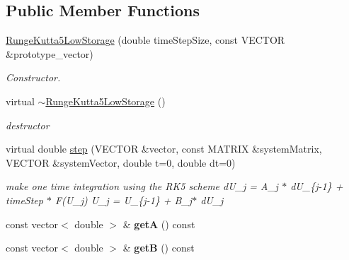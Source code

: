 \subsection*{Public Member Functions}
\begin{DoxyCompactItemize}
\item 
\hyperlink{classnatrium_1_1RungeKutta5LowStorage_a1f879ee900db9ac82ddd12820e7b703d}{RungeKutta5LowStorage} (double timeStepSize, const VECTOR \&prototype\_\-vector)
\begin{DoxyCompactList}\small\item\em Constructor. \item\end{DoxyCompactList}\item 
\hypertarget{classnatrium_1_1RungeKutta5LowStorage_a915493da30cf9308bd47e87d0c20cad8}{
virtual \hyperlink{classnatrium_1_1RungeKutta5LowStorage_a915493da30cf9308bd47e87d0c20cad8}{$\sim$RungeKutta5LowStorage} ()}
\label{classnatrium_1_1RungeKutta5LowStorage_a915493da30cf9308bd47e87d0c20cad8}

\begin{DoxyCompactList}\small\item\em destructor \item\end{DoxyCompactList}\item 
\hypertarget{classnatrium_1_1RungeKutta5LowStorage_a90a1bec53a8fd458a190d3e9f8c78478}{
virtual double \hyperlink{classnatrium_1_1RungeKutta5LowStorage_a90a1bec53a8fd458a190d3e9f8c78478}{step} (VECTOR \&vector, const MATRIX \&systemMatrix, VECTOR \&systemVector, double t=0, double dt=0)}
\label{classnatrium_1_1RungeKutta5LowStorage_a90a1bec53a8fd458a190d3e9f8c78478}

\begin{DoxyCompactList}\small\item\em make one time integration using the RK5 scheme dU\_\-j = A\_\-j $\ast$ dU\_\-\{j-\/1\} + timeStep $\ast$ F(U\_\-j) U\_\-j = U\_\-\{j-\/1\} + B\_\-j$\ast$ dU\_\-j \item\end{DoxyCompactList}\item 
\hypertarget{classnatrium_1_1RungeKutta5LowStorage_a452fad5bef3b7734c94ca5796ce0c589}{
const vector$<$ double $>$ \& {\bfseries getA} () const }
\label{classnatrium_1_1RungeKutta5LowStorage_a452fad5bef3b7734c94ca5796ce0c589}

\item 
\hypertarget{classnatrium_1_1RungeKutta5LowStorage_ac866c3f75f850ab90b70b3eaedd3cc3c}{
const vector$<$ double $>$ \& {\bfseries getB} () const }
\label{classnatrium_1_1RungeKutta5LowStorage_ac866c3f75f850ab90b70b3eaedd3cc3c}


\end{DoxyCompactItemize}
